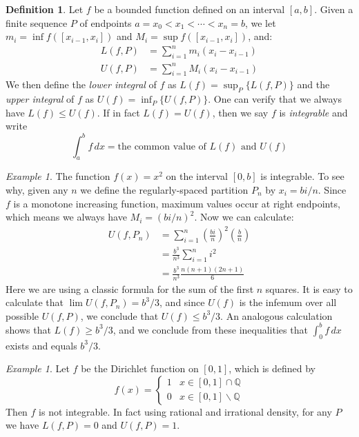 \documentclass[11pt,oneside]{amsbook}
\newcommand{\Q}{\mathbb Q}
\renewcommand{\setminus}{\smallsetminus}
\theoremstyle{definition}
\theoremstyle{plain}
\theoremstyle{definition}
\newtheorem{definition}[theorem]{Definition}
\theoremstyle{remark}
\newtheorem{example}[theorem]{Example}
\numberwithin{equation}{section}
\numberwithin{figure}{section}
\begin{document}
\begin{definition}
  Let $f$ be a bounded function defined on an interval $[a,b]$. Given a finite sequence $P$ of endpoints $a=x_0<x_1<\cdots<x_n=b$, we let $m_i=\inf f([x_{i-1},x_i])$ and $M_i=\sup f([x_{i-1},x_i])$, and:
  \begin{align*}
    L(f,P)&=\sum_{i=1}^n m_i(x_i-x_{i-1})\\
    U(f,P)&=\sum_{i=1}^n M_i(x_i-x_{i-1})
  \end{align*}
  We then define the \emph{lower integral} of $f$ as $L(f)=\sup_P\{L(f,P)\}$ and the \emph{upper integral} of $f$ as $U(f)=\inf_P\{U(f,P)\}$. One can verify that we always have $L(f)\leq U(f)$. If in fact $L(f)=U(f)$, then we say $f$ is \emph{integrable} and write
  \[\int_a^bf\,dx=\text{the common value of }L(f)\text{ and }U(f)
  \]
\end{definition}

\begin{example}
  The function $f(x)=x^2$ on the interval $[0,b]$ is integrable. To see why, given any $n$ we define the regularly-spaced partition $P_n$ by $x_i=bi/n$. Since $f$ is a monotone increasing function, maximum values occur at right endpoints, which means we always have $M_i=(bi/n)^2$. Now we can calculate:
  \begin{align*}
    U(f,P_n)&=\sum_{i=1}^n\left(\frac{bi}{n}\right)^2\left(\frac{b}{n}\right)\\
    &=\frac{b^3}{n^3}\sum_{i=1}^n i^2\\
    &=\frac{b^3}{n^3}\frac{n(n+1)(2n+1)}{6}
  \end{align*}
  Here we are using a classic formula for the sum of the first $n$ squares. It is easy to calculate that $\lim U(f,P_n)=b^3/3$, and since $U(f)$ is the infemum over all possible $U(f,P)$, we conclude that $U(f)\leq b^3/3$. An analogous calculation shows that $L(f)\geq b^3/3$, and we conclude from these inequalities that $\int_0^bf\,dx$ exists and equals $b^3/3$.
\end{example}

\begin{example}
  Let $f$ be the Dirichlet function on $[0,1]$, which is defined by
  \[f(x)=\begin{cases}1&x\in[0,1]\cap\Q\\0&x\in[0,1]\setminus\Q\end{cases}
  \]
  Then $f$ is not integrable. In fact using rational and irrational density, for any $P$ we have $L(f,P)=0$ and $U(f,P)=1$.
\end{example}
\end{document}
